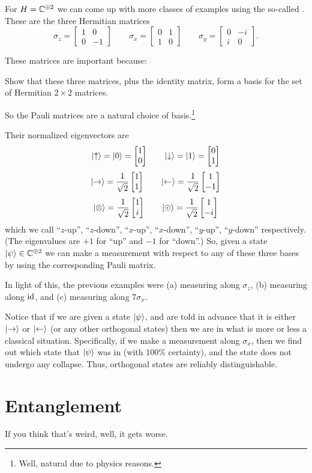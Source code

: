 For $H = \mathbb C^{\oplus 2}$ we can come up with more classes of examples using
the so-called .
These are the three Hermitian matrices
\[
	\sigma_z = \begin{bmatrix} 1 & 0 \\ 0 & -1 \end{bmatrix}
	\qquad
	\sigma_x = \begin{bmatrix} 0 & 1 \\ 1 & 0 \end{bmatrix}
	\qquad
	\sigma_y = \begin{bmatrix} 0 & -i \\ i & 0 \end{bmatrix}.
\]

These matrices are important because:
\begin{ques}
	Show that these three matrices, plus the identity matrix,
	form a basis for the set of Hermitian $2 \times 2$ matrices.
\end{ques}
So the Pauli matrices are a natural choice of basis.\footnote{Well,
	natural due to physics reasons.
}

Their normalized eigenvectors are
\[ \ket\uparrow = \ket0 = \begin{bmatrix} 1 \\ 0 \end{bmatrix} \qquad \ket\downarrow = \ket1 = \begin{bmatrix} 0 \\ 1 \end{bmatrix} \]
\[ \ket\rightarrow = \frac{1}{\sqrt2}\begin{bmatrix} 1 \\ 1 \end{bmatrix}
	\qquad \ket\leftarrow = \frac{1}{\sqrt2}\begin{bmatrix} 1 \\ -1 \end{bmatrix} \]
\[ \ket\otimes = \frac{1}{\sqrt2}\begin{bmatrix} 1 \\ i \end{bmatrix}
	\qquad \ket\odot = \frac{1}{\sqrt2}\begin{bmatrix} 1 \\ -i \end{bmatrix} \]
which we call ``$z$-up'', ``$z$-down'',
``$x$-up'', ``$x$-down'', ``$y$-up'', ``$y$-down'' respectively.
(The eigenvalues are $+1$ for ``up'' and $-1$ for ``down''.)
So, given a state $\ket\psi \in \mathbb C^{\oplus 2}$
we can make a measurement with respect to any of these three bases
by using the corresponding Pauli matrix.

In light of this, the previous examples were
(a) measuring along $\sigma_z$,
(b) measuring along $\mathrm{id}$,
and (c) measuring along $7\sigma_x$.

Notice that if we are given a state $\ket\psi$,
and are told in advance that it is either $\ket\rightarrow$ or $\ket\leftarrow$
(or any other orthogonal states)
then we are in what is more or less a classical situation.
Specifically, if we make a measurement along $\sigma_x$,
then we find out which state that $\ket\psi$ was in (with 100\% certainty),
and the state does not undergo any collapse.
Thus, orthogonal states are reliably distinguishable.

\section{Entanglement}
If you think that's weird, well, it gets worse.

